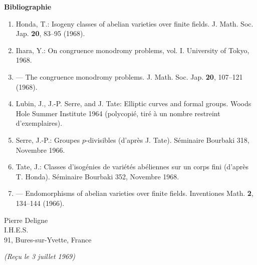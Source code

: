 \documentclass[10pt]{article}
\begin{document}
\begin{center}
\bfseries Bibliographie
\end{center}

\begin{enumerate}[label=\arabic*.,leftmargin=2.4em]
\item Honda, T.: Isogeny classes of abelian varieties over finite fields. J. Math. Soc. Jap. \textbf{20}, 83--95 (1968).
\item Ihara, Y.: On congruence monodromy problems, vol. I. University of Tokyo, 1968.
\item --- The congruence monodromy problems. J. Math. Soc. Jap. \textbf{20}, 107--121 (1968).
\item Lubin, J., J.-P. Serre, and J. Tate: Elliptic curves and formal groups. Woods Hole Summer Institute 1964 (polycopié, tiré à un nombre restreint d'exemplaires).
\item Serre, J.-P.: Groupes $p$-divisibles (d'après J. Tate). Séminaire Bourbaki 318, Novembre 1966.
\item Tate, J.: Classes d'isogénies de variétés abéliennes sur un corps fini (d'après T. Honda). Séminaire Bourbaki 352, Novembre 1968.
\item --- Endomorphisms of abelian varieties over finite fields. Inventiones Math. \textbf{2}, 134--144 (1966).
\end{enumerate}

\begin{flushright}
Pierre Deligne\\
I.H.E.S.\\
91, Bures-sur-Yvette, France
\end{flushright}

\begin{center}
\emph{(Reçu le 3 juillet 1969)}
\end{center}
\end{document}
